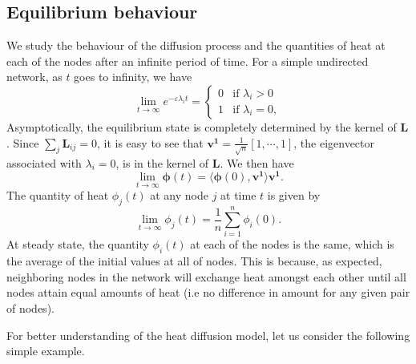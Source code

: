 \documentclass[10pt,a4paper]{article}
\theoremstyle{plain}
\theoremstyle{definition}
\begin{document}
    	 \subsection{ Equilibrium behaviour }
    	 We study the behaviour of the diffusion process and the quantities of heat at each of the nodes after an infinite period of time. 
    	 For a simple undirected network, as $t$ goes to infinity, we have 
    	 \begin{equation}
    	 \lim_{t \to \infty} e^{-\varepsilon\lambda_i t} = \begin{cases} 0 &\mbox{if } \lambda_i > 0 \\
    	 1 & \mbox{if } \lambda_i = 0, \end{cases} 
    	 \end{equation}
    	 Asymptotically, the equilibrium state is completely determined by the kernel of $\mathbf{L}$. Since $\sum_{j} \mathbf{L}_{ij}=0$, it is easy to see that $\mathbf{v^1}= \frac{1}{\sqrt{n}}[1,\cdots,1]$, the eigenvector associated with $\lambda_i =0$, is in the kernel of $\mathbf{L}$. We then have
    	 \begin{equation}
    	 \lim_{t \to \infty}\boldsymbol{\phi}(t) = \langle \boldsymbol{\phi}(0), \mathbf{v^1} \rangle \mathbf{v^1}.
    	 \end{equation}
    	 The quantity of heat $\phi_j(t)$ at any node $j$ at time $t$ is given by
    	 \begin{equation}
    	 \lim_{t \to \infty}\phi_j(t) = \frac{1}{n} \sum_{i = 1}^n \phi_i(0). 
    	 \end{equation}
    	 At steady state, the quantity $\phi_i(t)$ at each of the nodes is the same, which is the average of the initial values at all of nodes. This is because, as expected, neighboring nodes in the network will exchange heat amongst each other until all nodes attain equal amounts of heat (i.e no difference in amount for any given pair of nodes).
    	 
    	 For better understanding of the heat diffusion model, let us consider the following simple example.
    	 
\end{document}
